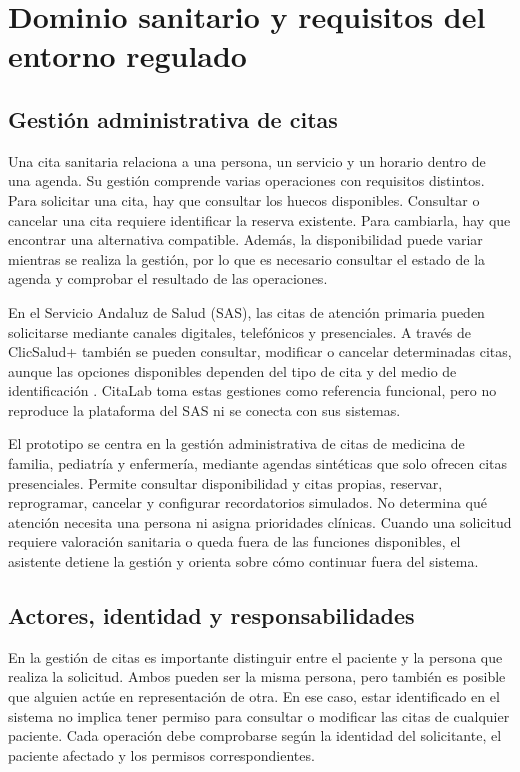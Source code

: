 \chapter{Dominio sanitario y requisitos del entorno regulado}
\label{chap:dominio-regulado}

\section{Gestión administrativa de citas}

Una cita sanitaria relaciona a una persona, un servicio y un horario dentro de una agenda. Su gestión comprende varias operaciones con requisitos distintos. Para solicitar una cita, hay que consultar los huecos disponibles. Consultar o cancelar una cita requiere identificar la reserva existente. Para cambiarla, hay que encontrar una alternativa compatible. Además, la disponibilidad puede variar mientras se realiza la gestión, por lo que es necesario consultar el estado de la agenda y comprobar el resultado de las operaciones.

En el Servicio Andaluz de Salud (SAS), las citas de atención primaria pueden solicitarse mediante canales digitales, telefónicos y presenciales. A través de ClicSalud+ también se pueden consultar, modificar o cancelar determinadas citas, aunque las opciones disponibles dependen del tipo de cita y del medio de identificación \citep{sasCitaPrimaria,sasGestionCitas}. CitaLab toma estas gestiones como referencia funcional, pero no reproduce la plataforma del SAS ni se conecta con sus sistemas.

El prototipo se centra en la gestión administrativa de citas de medicina de familia, pediatría y enfermería, mediante agendas sintéticas que solo ofrecen citas presenciales. Permite consultar disponibilidad y citas propias, reservar, reprogramar, cancelar y configurar recordatorios simulados. No determina qué atención necesita una persona ni asigna prioridades clínicas. Cuando una solicitud requiere valoración sanitaria o queda fuera de las funciones disponibles, el asistente detiene la gestión y orienta sobre cómo continuar fuera del sistema.

\section{Actores, identidad y responsabilidades}

En la gestión de citas es importante distinguir entre el paciente y la persona que realiza la solicitud. Ambos pueden ser la misma persona, pero también es posible que alguien actúe en representación de otra. En ese caso, estar identificado en el sistema no implica tener permiso para consultar o modificar las citas de cualquier paciente. Cada operación debe comprobarse según la identidad del solicitante, el paciente afectado y los permisos correspondientes.

